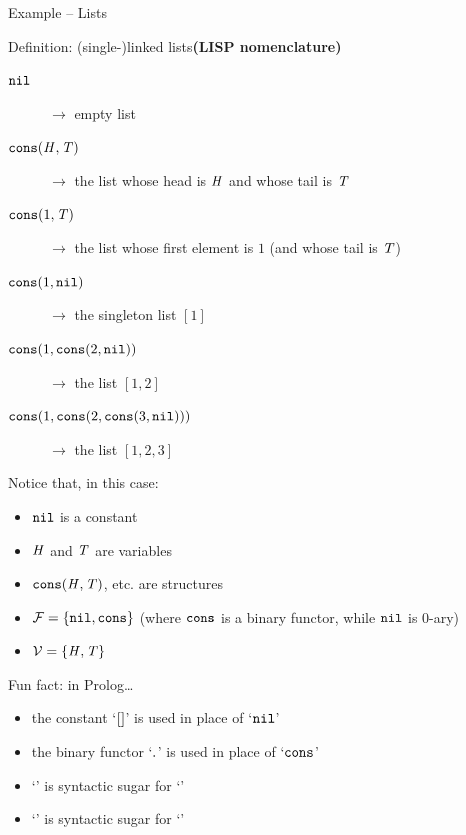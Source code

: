 \documentclass[presentation]{beamer}\mode<presentation>{\usetheme{AMSBolognaFC}}
\begin{document}
\begin{frame}[allowframebreaks]{Example -- Lists}
    \begin{exampleblock}{Definition: (single-)linked lists\hfill\textbf{\footnotesize(LISP nomenclature)}}
        \begin{description}
            \item[$\mathtt{nil}$] $\rightarrow$ empty list
            \item[$\mathtt{cons}(\mathit{H}, \mathit{T})$] $\rightarrow$ the list whose head is $\mathit{H}$ and whose tail is $\mathit{T}$
            \item[$\mathtt{cons}(1, \mathit{T})$] $\rightarrow$ the list whose first element is $1$ (and whose tail is $\mathit{T}$)
            \item[$\mathtt{cons}(1, \mathtt{nil})$] $\rightarrow$ the singleton list $[1]$
            \item[$\mathtt{cons}(1, \mathtt{cons}(2, \mathtt{nil}))$] $\rightarrow$ the list $[1,2]$
            \item[$\mathtt{cons}(1, \mathtt{cons}(2, \mathtt{cons}(3, \mathtt{nil})))$] $\rightarrow$ the list $[1,2,3]$
        \end{description}
    \end{exampleblock}
    \begin{exampleblock}{Notice that, in this case:}
        \begin{itemize}
            \item $\mathtt{nil}$ is a constant
            \item $\mathit{H}$ and $\mathit{T}$ are variables
            \item $\mathtt{cons}(\mathit{H}, \mathit{T})$, etc. are structures
            \item $\mathcal{F} = \{ \mathtt{nil}, \mathtt{cons} \}$ \hfill {\footnotesize(where $\mathtt{cons}$ is a binary functor, while $\mathtt{nil}$ is 0-ary)}
            \item $\mathcal{V} = \{ \mathit{H}, \mathit{T}\}$
        \end{itemize}
    \end{exampleblock}
    \begin{alertblock}{Fun fact: in Prolog\dots}
        \begin{itemize}
            \item the constant `\alert{$\mathtt{[]}$}' is used in place of `\alert{$\mathtt{nil}$}'
            \item the binary functor `\alert{$\mathtt{.}$}' is used in place of `\alert{$\mathtt{cons}$}'
            \item `\alert{}' is syntactic sugar for `\alert{}'
            \item `\alert{\pl{[1, 2, 3]}}' is syntactic sugar for `\alert{}'
        \end{itemize}
    \end{alertblock}
\end{frame}
\end{document}
